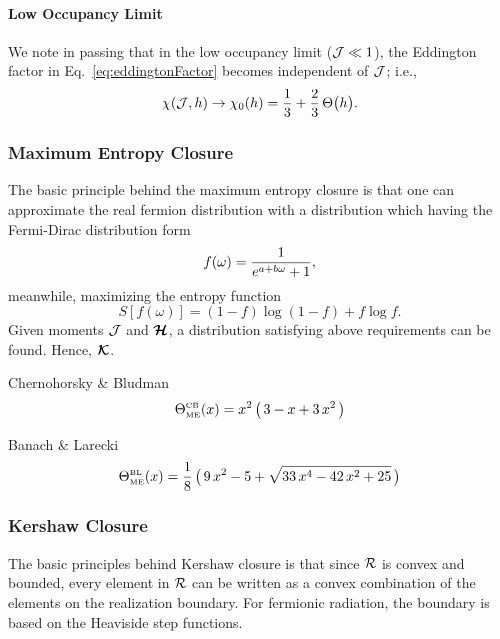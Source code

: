 \paragraph{Low Occupancy Limit}
We note in passing that in the low occupancy limit ($\mathcal{J}\ll1$), the Eddington factor in Eq.~\eqref{eq:eddingtonFactor} becomes independent of $\mathcal{J}$; i.e.,
\begin{equation}
  \chi(\mathcal{J},h)\to\chi_{0}(h)=\frac{1}{3}+\frac{2}{3}\,\Theta\big(h\big).  
  \label{eq:eddingtonFactorLow}
\end{equation}

\subsubsection{Maximum Entropy Closure}
The basic principle behind the maximum entropy closure is that one can approximate the real fermion distribution with a distribution which having the Fermi-Dirac distribution form 
\begin{equation}
f(\omega)=\frac{1}{e^{a + b\omega}+1}, 
\end{equation} 
meanwhile, maximizing the entropy function
\begin{equation}
S[f(\omega)] = (1-f)\log(1-f) + f\log f.
\end{equation} 
Given moments $\mathcal{J}$ and $\boldsymbol{\mathcal{H}}$, a distribution satisfying above requirements can be found. Hence, $\boldsymbol{\mathcal{K}}$.

Chernohorsky \& Bludman \cite{cernohorskyBludman_1994}
\begin{equation}
  \Theta_{\mbox{\tiny ME}}^{\mbox{\tiny CB}}(x)
  =x^{2}\,\big(\,3-x+3\,x^{2}\,\big)
\end{equation}

Banach \& Larecki \cite{banachLarecki_2017b}
\begin{equation}
  \Theta_{\mbox{\tiny ME}}^{\mbox{\tiny BL}}(x)
  =\frac{1}{8}\,\big(\,9\,x^{2}-5+\sqrt{33\,x^{4}-42\,x^{2}+25}\,\big)
\end{equation}

\subsubsection{Kershaw Closure}
The basic principles behind Kershaw closure is that since $\mathcal{R}$ is convex and bounded, every element in $\mathcal{R}$ can be written as a convex combination of the elements on the realization boundary.
For fermionic radiation, the boundary is based on the Heaviside step functions.

